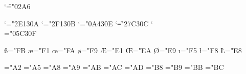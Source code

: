 \mathcode`\f="02A6

%

\delcode`\<="2E130A
\delcode`\>="2F130B
\delcode`\/="0A430E
\delcode`\|="27C30C
\delcode`\\="05C30F


\chardef\ss="FB
\chardef\ae="F1
\chardef\oe="FA
\chardef\o="F9
\chardef\AE="E1
\chardef\OE="EA
\chardef\O="E9
\chardef\i="F5 %
\def\j{\@PSsub\j{j}}
\def\aa{\accent"CAa }
\chardef\l="F8
\chardef\L="E8

\def\_{\char'137 }
\def\AA{\leavevmode\setbox0\hbox{h}\dimen@\ht0\advance\dimen@-1ex%
  \rlap{\kern.2em\raise.67\dimen@\hbox{\char'312}}A}

\chardef\cent="A2
\chardef\yen="A5
\chardef\currency="A8
\chardef\quotesingle="A9
\chardef\guillemotleft="AB
\chardef\guilsinglleft="AC
\chardef\guilsinglright="AD
\chardef\quotesinglbase="B8
\chardef\quotedblbase="B9
\chardef\guillemotright="BB
\chardef\ellipsis="BC

\def\@ldots{\mathinner\mathchar"00BC }
\def\ldots{\protect\pldots}
\def\pldots{\relax\ifmmode\@ldots\else\mbox{$\@ldots$}\fi}

